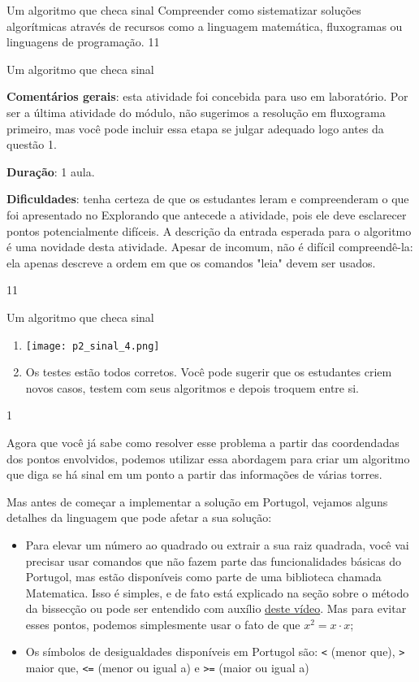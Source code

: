 \label{comp-exp11}
\begin{objectives}{Um algoritmo que checa sinal}
{
Compreender como sistematizar soluções algorítmicas através de recursos como a linguagem matemática, fluxogramas ou linguagens de programação.
}{1}{1}
\end{objectives}
\begin{sugestions}{Um algoritmo que checa sinal}
{
\textbf{Comentários gerais}: esta atividade foi concebida para uso em laboratório. Por ser a última atividade do módulo, não sugerimos a resolução em fluxograma primeiro, mas você pode incluir essa etapa se julgar adequado logo antes da questão 1.

\textbf{Duração}: 1 aula.

\textbf{Dificuldades}: tenha certeza de que os estudantes leram e compreenderam o que foi apresentado no Explorando que antecede a atividade, pois ele deve esclarecer pontos potencialmente difíceis. A descrição da entrada esperada para o algoritmo é uma novidade desta atividade. Apesar de incomum, não é difícil compreendê-la: ela apenas descreve a ordem em que os comandos "leia"{} devem ser usados.
}{1}{1}
\end{sugestions}
\begin{answer}{Um algoritmo que checa sinal}
{

\begin{enumerate}
\item {}
{
\texttt{[image: p2\_sinal\_4.png]}
}

\item Os testes estão todos corretos. Você pode sugerir que os estudantes criem novos casos, testem com seus algoritmos e depois troquem entre si.
\end{enumerate}
}{1}
\end{answer}

Agora que você já sabe como resolver esse problema a partir das coordendadas dos pontos envolvidos, podemos utilizar essa abordagem para criar um algoritmo que diga se há sinal em um ponto a partir das informações de várias torres.

Mas antes de começar a implementar a solução em Portugol, vejamos alguns detalhes da linguagem que pode afetar a sua solução:

\begin{itemize}
\item Para elevar um número ao quadrado ou extrair a sua raiz quadrada, você vai precisar usar comandos que não fazem parte das funcionalidades básicas do Portugol, mas estão disponíveis como parte de uma biblioteca chamada Matematica. Isso é simples, e de fato está explicado na seção sobre o método da bissecção ou pode ser entendido com auxílio \href{https://www.youtube.com/watch?v=rs8ihN08bgU&feature=youtu.be}{deste vídeo}. Mas para evitar esses pontos, podemos simplesmente usar o fato de que $x^2 = x \cdot x$;
\item Os símbolos de desigualdades disponíveis em Portugol são: \verb|<| (menor que), \verb|>| maior que, \verb|<=| (menor ou igual a) e \verb|>=| (maior ou igual a)
\end{itemize}

